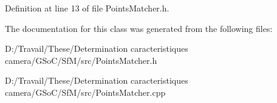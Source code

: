 Definition at line 13 of file PointsMatcher.h.



The documentation for this class was generated from the following files:\begin{DoxyCompactItemize}
\item 
D:/Travail/These/Determination caracteristiques camera/GSoC/SfM/src/PointsMatcher.h\item 
D:/Travail/These/Determination caracteristiques camera/GSoC/SfM/src/PointsMatcher.cpp\end{DoxyCompactItemize}

